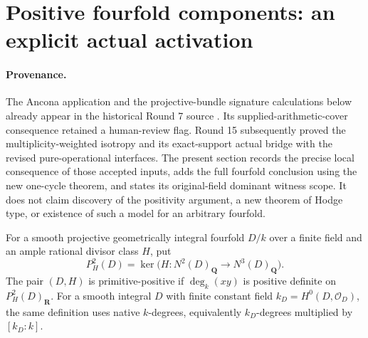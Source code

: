 \section{Positive fourfold components: an explicit actual activation}
\label{r16pos:section}

\paragraph{Provenance.}
The Ancona application and the projective-bundle signature calculations
below already appear in the historical Round 7 source
.
Its supplied-arithmetic-cover consequence retained a human-review flag.
Round 15 subsequently proved the multiplicity-weighted isotropy and
its exact-support actual bridge with the revised pure-operational
interfaces. The present section records the precise local consequence
of those accepted inputs, adds the full fourfold conclusion using
the new one-cycle theorem, and states its original-field dominant
witness scope. It does not claim discovery of the positivity
argument, a new theorem of Hodge type, or existence of such a model
for an arbitrary fourfold.

\begin{definition}
\label{r16pos:definition}
For a smooth projective geometrically integral fourfold $D/k$ over
a finite field and an ample rational divisor class $H$, put
\[
 P_H^2(D)=\ker\bigl(H:N^2(D)_{\mathbf Q}
                              \longrightarrow N^3(D)_{\mathbf Q}\bigr).
 \tag{PP16.1}\label{r16pos:primitive}
\]
The pair $(D,H)$ is primitive-positive if
$\deg_k(xy)$ is positive definite on $P_H^2(D)_{\mathbf R}$.
For a smooth integral $D$ with finite constant field
$k_D=H^0(D,\mathcal O_D)$, the same definition uses native
$k$-degrees, equivalently $k_D$-degrees multiplied by $[k_D:k]$.
\end{definition}

